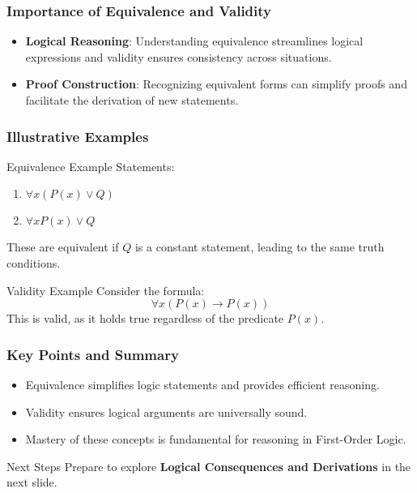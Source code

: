 \documentclass[aspectratio=169]{beamer}
\begin{document}
\begin{frame}[fragile]
    \frametitle{Importance of Equivalence and Validity}
    
    \begin{itemize}
        \item \textbf{Logical Reasoning}: Understanding equivalence streamlines logical expressions and validity ensures consistency across situations.
        \item \textbf{Proof Construction}: Recognizing equivalent forms can simplify proofs and facilitate the derivation of new statements.
    \end{itemize}
    
\end{frame}

\begin{frame}[fragile]
    \frametitle{Illustrative Examples}
    
    \begin{block}{Equivalence Example}
        Statements:
        \begin{enumerate}
            \item \( \forall x (P(x) \lor Q) \)
            \item \( \forall x P(x) \lor Q \)
        \end{enumerate}
        These are equivalent if \( Q \) is a constant statement, leading to the same truth conditions.
    \end{block}
    
    \begin{block}{Validity Example}
        Consider the formula: 
        \[
        \forall x (P(x) \rightarrow P(x))
        \]
        This is valid, as it holds true regardless of the predicate \( P(x) \).
    \end{block}
    
\end{frame}

\begin{frame}[fragile]
    \frametitle{Key Points and Summary}
    
    \begin{itemize}
        \item Equivalence simplifies logic statements and provides efficient reasoning.
        \item Validity ensures logical arguments are universally sound.
        \item Mastery of these concepts is fundamental for reasoning in First-Order Logic.
    \end{itemize}
    
    \begin{block}{Next Steps}
        Prepare to explore \textbf{Logical Consequences and Derivations} in the next slide.
    \end{block}
    
\end{frame}
\end{document}
